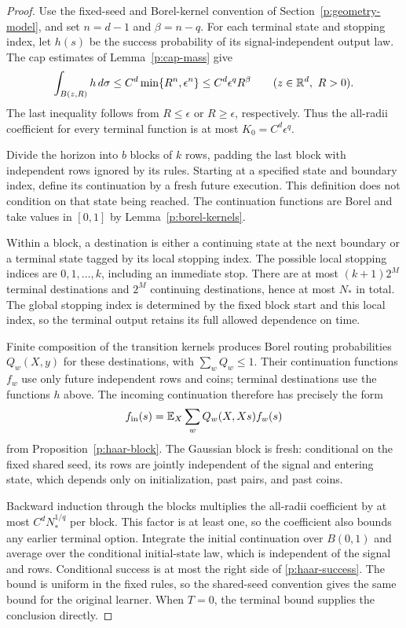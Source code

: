 \begin{proof}
Use the fixed-seed and Borel-kernel convention of
Section~\ref{p:geometry-model}, and set \(n=d-1\) and \(\beta=n-q\).
For each terminal state and stopping index, let \(h(s)\) be the success
probability of its signal-independent output law. The cap estimates of
Lemma~\ref{p:cap-mass} give
\[
 \int_{B(z,R)}h\,d\sigma
 \le C^d\min\{R^n,\epsilon^n\}
 \le C^d\epsilon^q R^\beta
 \qquad(z\in\mathbb R^d,\ R>0).
\]
The last inequality follows from \(R\le\epsilon\) or
\(R\ge\epsilon\), respectively. Thus the all-radii coefficient for
every terminal function is at most \(K_0=C^d\epsilon^q\).

Divide the horizon into \(b\) blocks of \(k\) rows, padding the last
block with independent rows ignored by its rules. Starting at a specified
state and boundary index, define its continuation by a fresh future
execution. This definition does not condition on that state being reached.
The continuation functions are Borel and take values in \([0,1]\) by
Lemma~\ref{p:borel-kernels}.

Within a block, a destination is either a continuing state at the next
boundary or a terminal state tagged by its local stopping index. The
possible local stopping indices are \(0,1,\ldots,k\), including an
immediate stop. There are at most \((k+1)2^M\) terminal destinations and
\(2^M\) continuing destinations, hence at most \(N_*\) in total. The
global stopping index is determined by the fixed block start and this
local index, so the terminal output retains its full allowed dependence
on time.

Finite composition of the transition kernels produces Borel routing
probabilities \(Q_w(X,y)\) for these destinations, with
\(\sum_wQ_w\le1\). Their continuation functions \(f_w\) use only
future independent rows and coins; terminal destinations use the functions
\(h\) above. The incoming continuation therefore has precisely the form
\[
 f_{\mathrm{in}}(s)=\mathbb E_X\sum_wQ_w(X,Xs)f_w(s)
\]
from Proposition~\ref{p:haar-block}. The Gaussian block is fresh:
conditional on the fixed shared seed, its rows are jointly independent of
the signal and entering state, which depends only on initialization,
past pairs, and past coins.

Backward induction through the blocks multiplies the all-radii
coefficient by at most \(C^dN_*^{1/q}\) per block. This factor is at
least one, so the coefficient also bounds any earlier terminal option.
Integrate the initial continuation over \(B(0,1)\) and average over the
conditional initial-state law, which is independent of the signal and
rows. Conditional success is at most the right side of
\eqref{p:haar-success}. The bound is uniform in the fixed rules, so the
shared-seed convention gives the same bound for the original learner.
When \(T=0\), the terminal bound supplies the conclusion directly.
\end{proof}

